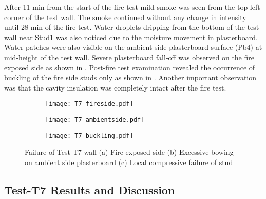 After 11 min from the start of the fire test mild smoke was seen from the top left corner of the test wall. The smoke continued without any change in  intensity until 28 min of the fire test. Water droplets dripping from the bottom of the test wall near Stud1 was also noticed due to the moisture movement in plasterboard. Water patches were also visible on the ambient side plasterboard surface (Pb4) at mid-height of the test wall. Severe plasterboard fall-off was observed on the fire exposed side as shown in . Post-fire test examination revealed the occurrence of buckling of the fire side studs only as shown in . Another important observation was that the cavity insulation was completely intact after the fire test. 
\begin{figure}[!htbp]
	\centering
	\begin{subfigure}[b]{0.4\textwidth}
		\centering
		\texttt{[image: T7-fireside.pdf]}
		\caption{}
		\label{subfig:T7-fireside}
	\end{subfigure}
	\begin{subfigure}[b]{0.4\textwidth}
		\centering
		\texttt{[image: T7-ambientside.pdf]}
		\caption{}
		\label{subfig:T7-ambientside}
	\end{subfigure}
	\begin{subfigure}[b]{0.4\textwidth}
		\centering
		\texttt{[image: T7-buckling.pdf]}
		\caption{}
		\label{subfig:T7-buckling}
	\end{subfigure}
	   \caption{Failure of Test-T7 wall (a) Fire exposed side (b) Excessive bowing on ambient side plasterboard (c) Local compressive failure of stud}
	   \label{fig:T7-failure}
\end{figure}

\subsection{Test-T7 Results and Discussion}

